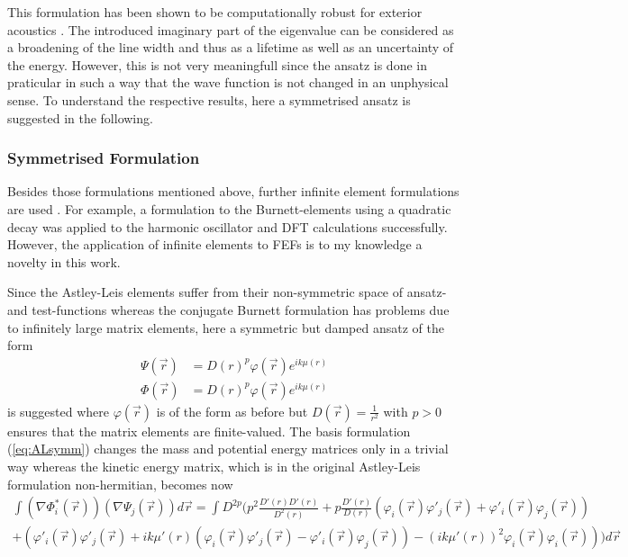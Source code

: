 This formulation has been shown to be computationally robust for exterior acoustics \cite{dreyer_effectiveness,astley_stability}.
The introduced imaginary part of the eigenvalue can be considered as a broadening of the line width and thus as a lifetime as well as an uncertainty of the energy.
However, this is not very meaningfull since the ansatz is done in praticular in such a way that the wave function is not changed in an unphysical sense.
To understand the respective results, here a symmetrised ansatz is suggested in the following.

\subsubsection{Symmetrised Formulation}
Besides those formulations mentioned above, further infinite element formulations are used \cite{dreyer}.
For example, a formulation to the Burnett-elements using a quadratic decay was applied to the harmonic oscillator \cite{bettessHarmonic} and DFT calculations \cite{sobaMolecule} successfully.
However, the application of infinite elements to FEFs is to my knowledge a novelty in this work.

Since the Astley-Leis elements suffer from their non-symmetric space of ansatz- and test-functions whereas the conjugate Burnett formulation has problems due to infinitely large matrix elements, here a symmetric but damped ansatz of the form
\begin{align} \label{eq:ALsymm}
\Psi(\vec{r}) &= D(r)^p\varphi(\vec{r}) e^{ik\mu(r)} \\
\Phi(\vec{r}) &= D(r)^p\varphi(\vec{r}) e^{ik\mu(r)}
\end{align}
is suggested where $\varphi(\vec{r})$ is of the form as before but $D(\vec{r})=\frac{1}{r^2}$ with $p>0$ ensures that the matrix elements are finite-valued.
The basis formulation (\ref{eq:ALsymm}) changes the mass and potential energy matrices only in a trivial way whereas the kinetic energy matrix, which is in the original Astley-Leis formulation non-hermitian, becomes now
\begin{multline} \label{eq:SymmKinE}
\int \left(\nabla \Phi^*_i(\vec{r})\right) \left(\nabla \Psi_j(\vec{r})\right) d\vec{r}=
\int D^{2p}\big(
p^2 \frac{D'(r) D'(r)}{D^2(r)} +p \frac{D'(r)}{D(r)} \left(\varphi_i(\vec{r})\varphi'_j(\vec{r})+ \varphi'_i(\vec{r})\varphi_j(\vec{r}) \right)\\
+ \left(  \varphi'_i(\vec{r})\varphi'_j(\vec{r}) + ik\mu'(r) \left(\varphi_i(\vec{r})\varphi'_j(\vec{r})- \varphi'_i(\vec{r})\varphi_j(\vec{r})  \right) -(ik\mu'(r))^2 \varphi_i(\vec{r})\varphi_i(\vec{r}) \right)
\big)d\vec{r}  
\end{multline}

